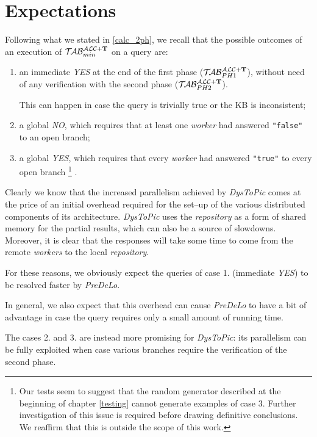\documentclass[a4paper, 11pt, oneside]{duthesis}
\newcommand{\tip}{{\bf T}}
\newcommand{\nuovoc}{\mathrel{{\mathcal{T}\!\mathcal{AB}}}_{min}^{\mathcal{ALC}+\mbox{\scriptsize $\tip$}}}
\newcommand{\primo}{\mathrel{{\mathcal{T}\!\mathcal{AB}}}_{PH 1}^{\mathcal{ALC}+\mbox{\scriptsize $\tip$}}}
\newcommand{\secondo}{\mathrel{{\mathcal{T}\!\mathcal{AB}}}_{PH 2}^{\mathcal{ALC}+\mbox{\scriptsize $\tip$}}}
\begin{document}
\section{Expectations}\label{expectations}
Following what we stated in \ref{calc_2ph}, we recall that the possible outcomes of an execution of $\nuovoc$ on a query are:
\begin{enumerate}
\item an immediate \emph{YES} at the end of the first phase ($\primo$), without need of any verification with the second phase ($\secondo$).

This can happen in case the query is trivially true or the KB is inconsistent;

\item a global \emph{NO}, which requires that at least one \emph{worker} had answered \texttt{"false"} to an open branch;

\item a global \emph{YES}, which requires that every \emph{worker} had answered \texttt{"true"} to every open branch
\footnote{Our tests seem to suggest that the random generator described at the beginning of chapter \ref{testing} cannot generate examples of case 3. Further investigation of this issue is required before drawing definitive conclusions. We reaffirm that this is outside the scope of this work.}
.
\end{enumerate}

Clearly we know that the increased parallelism achieved by \emph{DysToPic} comes at the price of an initial overhead required for the set--up of the various distributed components of its architecture.
\emph{DysToPic} uses the \emph{repository} as a form of shared memory for the partial results, which can also be a source of slowdowns.
Moreover, it is clear that the responses will take some time to come from the remote \emph{workers} to the local \emph{repository}.

For these reasons, we obviously expect the queries of case 1. (immediate \emph{YES}) to be resolved faster by \emph{PreDeLo}.

In general, we also expect that this overhead can cause \emph{PreDeLo} to have a bit of advantage in case the  query requires only a small amount of running time.

The cases 2. and 3. are instead more promising for \emph{DysToPic}: its parallelism can be fully exploited when case various branches require the verification of the second phase.

\newpage
\end{document}

